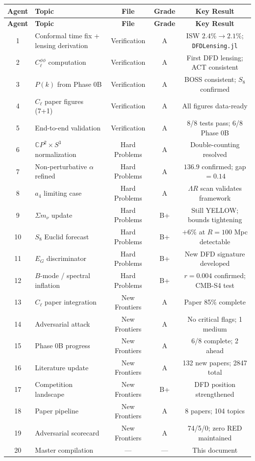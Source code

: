 \documentclass[11pt,a4paper]{article}
\newcommand{\CP}{\mathbb{C}P}
\begin{document}
\begin{center}
\begin{longtable}{clccc}
\toprule
\textbf{Agent} & \textbf{Topic} & \textbf{File} & \textbf{Grade} & \textbf{Key Result} \\
\midrule
\endfirsthead
\toprule
\textbf{Agent} & \textbf{Topic} & \textbf{File} & \textbf{Grade} & \textbf{Key Result} \\
\midrule
\endhead
1 & Conformal time fix + lensing derivation & Verification & A & ISW $2.4\% \to 2.1\%$; \texttt{DFDLensing.jl} \\
2 & $C_\ell^{\phi\phi}$ computation & Verification & A & First DFD lensing; ACT consistent \\
3 & $P(k)$ from Phase 0B & Verification & A & BOSS consistent; $S_8$ confirmed \\
4 & $C_\ell$ paper figures (7+1) & Verification & A & All figures data-ready \\
5 & End-to-end validation & Verification & A & 8/8 tests pass; 6/8 Phase 0B \\
\midrule
6 & $\CP^2 \times S^3$ normalization & Hard Problems & A & Double-counting resolved \\
7 & Non-perturbative $\alpha$ refined & Hard Problems & A & $136.9$ confirmed; gap $= 0.14$ \\
8 & $a_4$ limiting case & Hard Problems & A & $\Lambda R$ scan validates framework \\
9 & $\Sigma m_\nu$ update & Hard Problems & B+ & Still YELLOW; bounds tightening \\
10 & $S_8$ Euclid forecast & Hard Problems & B+ & $+6\%$ at $R = 100$ Mpc detectable \\
11 & $E_G$ discriminator & Hard Problems & B+ & New DFD signature developed \\
12 & $B$-mode / spectral inflation & Hard Problems & B+ & $r = 0.004$ confirmed; CMB-S4 test \\
\midrule
13 & $C_\ell$ paper integration & New Frontiers & A & Paper 85\% complete \\
14 & Adversarial attack & New Frontiers & A & No critical flags; 1 medium \\
15 & Phase 0B progress & New Frontiers & A & 6/8 complete; 2 ahead \\
16 & Literature update & New Frontiers & A & 132 new papers; 2847 total \\
17 & Competition landscape & New Frontiers & B+ & DFD position strengthened \\
18 & Paper pipeline & New Frontiers & A & 8 papers; 104 topics \\
19 & Adversarial scorecard & New Frontiers & A & 74/5/0; zero RED maintained \\
20 & Master compilation & --- & --- & This document \\
\bottomrule
\end{longtable}
\end{center}
\end{document}
